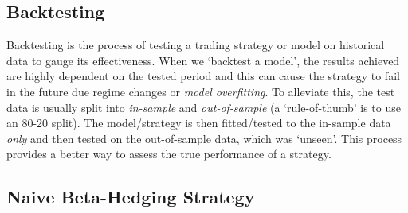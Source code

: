 \documentclass[11pt]{article}
\begin{document}
    \subsection{Backtesting}\label{backtesting}
    
Backtesting is the process of testing a trading strategy or model on
historical data to gauge its effectiveness. When we `backtest a model',
the results achieved are highly dependent on the tested period and this
can cause the strategy to fail in the future due  regime changes or
\emph{model overfitting}.
To alleviate this, the test data is usually split into \emph{in-sample}
and \emph{out-of-sample} (a `rule-of-thumb' is to use an 80-20 split).
The model/strategy is then fitted/tested to the in-sample data
\emph{only} and then tested on the out-of-sample data, which was
`unseen'. This process provides a better way to assess the true
performance of a strategy.

    \subsection{Naive Beta-Hedging Strategy}\label{naive-beta-hedging-strategy}
    
\end{document}
